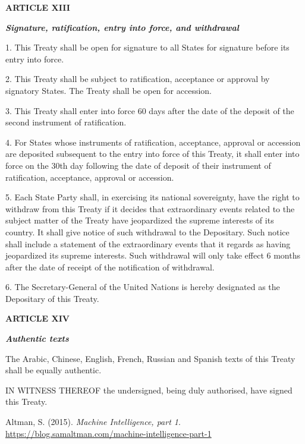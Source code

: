 \documentclass[12pt,a4paper]{article}
\begin{document}
\begin{center}
    
\textbf{{ARTICLE XIII}}

\textbf{\textit{Signature, ratification, entry into force, and withdrawal}}
\end{center}

1. This Treaty shall be open for signature to all States for signature before its entry into force. 

2. This Treaty shall be subject to ratification, acceptance or approval by signatory States. The Treaty shall be open for accession.

3. This Treaty shall enter into force 60 days after the date of the deposit of the second instrument of ratification. 

4. For States whose instruments of ratification, acceptance, approval or accession are deposited subsequent to the entry into force of this Treaty, it shall enter into force on the 30th day following the date of deposit of their instrument of ratification, acceptance, approval or accession.

5. Each State Party shall, in exercising its national sovereignty, have the right to withdraw from this Treaty if it decides that extraordinary events related to the subject matter of the Treaty have jeopardized the supreme interests of its country. It shall give notice of such withdrawal to the Depositary. Such notice shall include a statement of the extraordinary events that it regards as having jeopardized its supreme interests. Such withdrawal will only take effect 6 months after the date of receipt of the notification of withdrawal. 

6. The Secretary-General of the United Nations is hereby designated as the Depositary of this Treaty.

\begin{center}
    
\textbf{{ARTICLE XIV}}

\textbf{\textit{Authentic texts}}
\end{center}
The Arabic, Chinese, English, French, Russian and Spanish texts of this Treaty shall be equally authentic.

IN WITNESS THEREOF the undersigned, being duly authorised, have signed this Treaty.

\newpage


\sloppy

Altman, S. (2015). \textit{Machine Intelligence, part 1}. \url{https://blog.samaltman.com/machine-intelligence-part-1}
\end{document}
